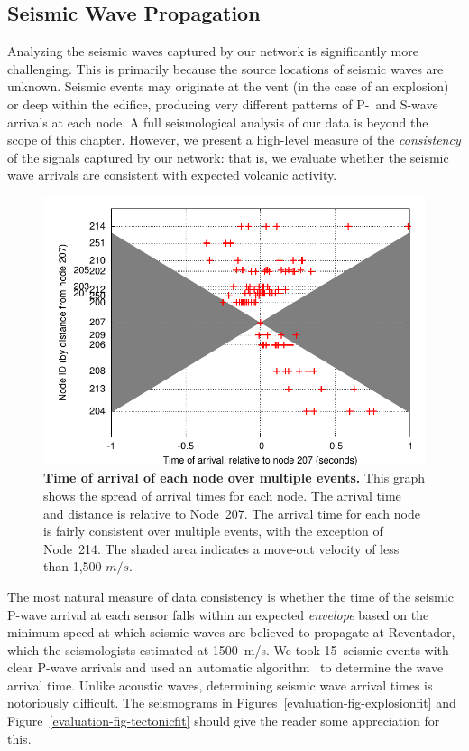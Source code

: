 \subsection{Seismic Wave Propagation}

Analyzing the seismic waves captured by our network is significantly more
challenging. This is primarily because the source locations of seismic waves
are unknown. Seismic events may originate at the vent (in the case of an
explosion) or deep within the edifice, producing very different patterns of
P-~and S-wave arrivals at each node. A full seismological analysis of our
data is beyond the scope of this chapter. However, we present a high-level
measure of the \textit{consistency} of the signals captured by our network:
that is, we evaluate whether the seismic wave arrivals are consistent with
expected volcanic activity.

\begin{figure}[t]
\begin{center}
\includegraphics[width=0.8\hsize]{./3-evaluation/figs/arrivaltimes.pdf}
\end{center}

\caption{\textbf{Time of arrival of each node over multiple events.} This
graph shows the spread of arrival times for each node. The arrival time and
distance is relative to Node~207. The arrival time for each node is fairly
consistent over multiple events, with the exception of Node~214. The shaded
area indicates a move-out velocity of less than 1,500 $m/s$.}

\label{evaluation-fig-arrivaltimes}
\end{figure}

The most natural measure of data consistency is whether the time of the
seismic P-wave arrival at each sensor falls within an expected
\textit{envelope} based on the minimum speed at which seismic waves are
believed to propagate at Reventador, which the seismologists estimated at
1500~m/s. We took 15~seismic events with clear P-wave arrivals and used an
automatic algorithm~\cite{pwave-picking} to determine the wave arrival time.
Unlike acoustic waves, determining seismic wave arrival times is notoriously
difficult. The seismograms in Figures~\ref{evaluation-fig-explosionfit} and
Figure~\ref{evaluation-fig-tectonicfit} should give the reader some
appreciation for this.

